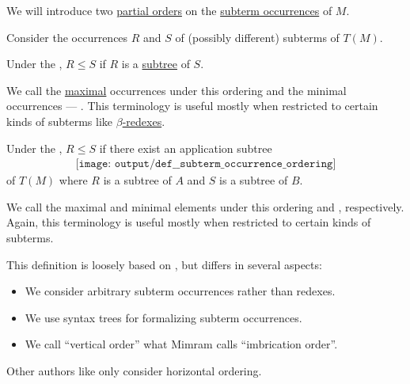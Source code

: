 \begin{definition}\label{def:subterm_occurrence_ordering}\mimprovised
  We will introduce two \hyperref[def:partially_ordered_set]{partial orders} on the \hyperref[def:lambda_subterm_occurrence]{subterm occurrences} of \( M \).

  Consider the occurrences \( R \) and \( S \) of (possibly different) subterms of \( T(M) \).

  \begin{thmenum}
     Under the , \( R \leq S \) if \( R \) is a \hyperref[def:tree/subtree]{subtree} of \( S \).

    We call the \hyperref[def:extremal_points/maximal_and_minimal_element]{maximal} occurrences under this ordering  and the minimal occurrences --- . This terminology is useful mostly when restricted to certain kinds of subterms like \hyperref[def:beta_eta_reduction]{\( \beta \)-redexes}.

     Under the , \( R \leq S \) if there exist an application subtree
    \begin{equation*}
      \begin{aligned}
        \texttt{[image: output/def\_\_subterm\_occurrence\_ordering]}
      \end{aligned}
    \end{equation*}
    of \( T(M) \) where \( R \) is a subtree of \( A \) and \( S \) is a subtree of \( B \).

    We call the maximal and minimal elements under this ordering  and , respectively. Again, this terminology is useful mostly when restricted to certain kinds of subterms.
  \end{thmenum}
\end{definition}
\begin{comments}
  \item This definition is loosely based on \cite[138]{Mimram2020Types}, but differs in several aspects:
  \begin{itemize}
    \item We consider arbitrary subterm occurrences rather than redexes.
    \item We use syntax trees for formalizing subterm occurrences.
    \item We call \enquote{vertical order} what Mimram calls \enquote{imbrication order}.
  \end{itemize}

  Other authors like  only consider horizontal ordering.
\end{comments}

